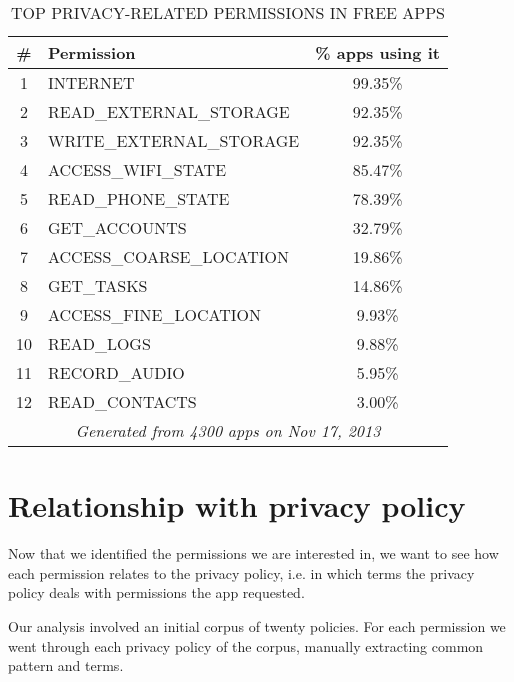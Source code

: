 \begin{table}[ht]
    \caption{TOP PRIVACY-RELATED PERMISSIONS IN FREE APPS}
    \label{tab:top-privacy-related-permissions}
    \centering
    \begin{tabular}{clc}
        \toprule
            \#   & Permission & \% apps using it \\
            \midrule
                1  & INTERNET                       &   99.35\% \\
                2  & READ\_EXTERNAL\_STORAGE        &   92.35\% \\
                3  & WRITE\_EXTERNAL\_STORAGE       &   92.35\% \\
                4  & ACCESS\_WIFI\_STATE            &   85.47\% \\
                5  & READ\_PHONE\_STATE             &   78.39\% \\
                6  & GET\_ACCOUNTS                  &   32.79\% \\
                7  & ACCESS\_COARSE\_LOCATION       &   19.86\% \\
                8  & GET\_TASKS                     &   14.86\% \\
                9  & ACCESS\_FINE\_LOCATION         &   9.93\%  \\
                10 & READ\_LOGS                     &   9.88\%  \\
                11 & RECORD\_AUDIO                  &   5.95\%  \\
                12 & READ\_CONTACTS                 &   3.00\%  \\
        \midrule
            \multicolumn{3}{c}{\footnotesize \emph{Generated from 4300 apps on Nov 17, 2013}} \\
        \bottomrule
    \end{tabular}
\end{table}

\section{Relationship with privacy policy}
Now that we identified the permissions we are interested in, we want to see how each permission relates to the privacy policy, i.e. in which terms the privacy policy deals with permissions the app requested.

Our analysis involved an initial corpus of twenty policies. For each permission we went through each privacy policy of the corpus, manually extracting common pattern and terms.

